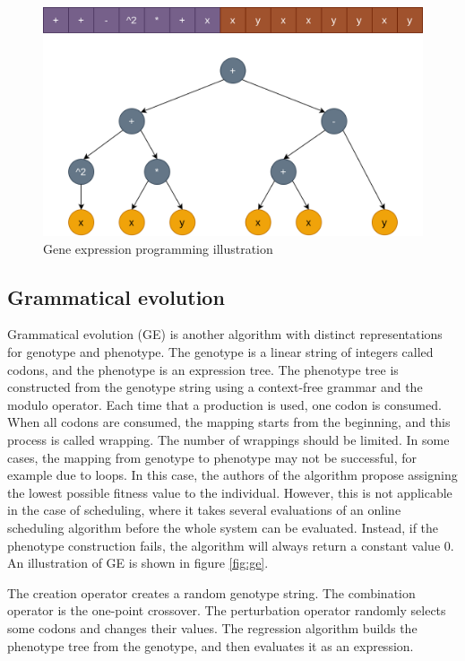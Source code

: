 \begin{figure}[!htbp]
	\centering
	\includegraphics[scale=0.3]{../images/gep.png}
	\caption{Gene expression programming illustration}
    \label{fig:gep}
\end{figure}

\subsection{Grammatical evolution}

Grammatical evolution (GE) \citep{ge} is another algorithm with distinct representations for genotype and phenotype. The genotype is a linear string of integers called codons, and the phenotype is an expression tree. The phenotype tree is constructed from the genotype string using a context-free grammar and the modulo operator. Each time that a production is used, one codon is consumed. When all codons are consumed, the mapping starts from the beginning, and this process is called wrapping. The number of wrappings should be limited. In some cases, the mapping from genotype to phenotype may not be successful, for example due to loops. In this case, the authors of the algorithm propose assigning the lowest possible fitness value to the individual. However, this is not applicable in the case of scheduling, where it takes several evaluations of an online scheduling algorithm before the whole system can be evaluated. Instead, if the phenotype construction fails, the algorithm will always return a constant value $0$. An illustration of GE is shown in figure \ref{fig:ge}.

The creation operator creates a random genotype string. The combination operator is the one-point crossover. The perturbation operator randomly selects some codons and changes their values. The regression algorithm builds the phenotype tree from the genotype, and then evaluates it as an expression.

